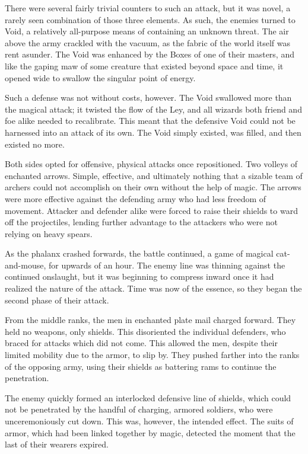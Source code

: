 There were several fairly trivial counters to such an attack, but it was novel, a rarely seen combination of those three elements. As such, the enemies turned to Void, a relatively all-purpose means of containing an unknown threat. The air above the army crackled with the vacuum, as the fabric of the world itself was rent asunder. The Void was enhanced by the Boxes of one of their masters, and like the gaping maw of some creature that existed beyond space and time, it opened wide to swallow the singular point of energy.

Such a defense was not without costs, however. The Void swallowed more than the magical attack; it twisted the flow of the Ley, and all wizards both friend and foe alike needed to recalibrate. This meant that the defensive Void could not be harnessed into an attack of its own. The Void simply existed, was filled, and then existed no more.

Both sides opted for offensive, physical attacks once repositioned. Two volleys of enchanted arrows. Simple, effective, and ultimately nothing that a sizable team of archers could not accomplish on their own without the help of magic. The arrows were more effective against the defending army who had less freedom of movement. Attacker and defender alike were forced to raise their shields to ward off the projectiles, lending further advantage to the attackers who were not relying on heavy spears.

As the phalanx crashed forwards, the battle continued, a game of magical cat-and-mouse, for upwards of an hour. The enemy line was thinning against the continued onslaught, but it was beginning to compress inward once it had realized the nature of the attack. Time was now of the essence, so they began the second phase of their attack.

From the middle ranks, the men in enchanted plate mail charged forward. They held no weapons, only shields. This disoriented the individual defenders, who braced for attacks which did not come. This allowed the men, despite their limited mobility due to the armor, to slip by. They pushed farther into the ranks of the opposing army, using their shields as battering rams to continue the penetration.

The enemy quickly formed an interlocked defensive line of shields, which could not be penetrated by the handful of charging, armored soldiers, who were unceremoniously cut down. This was, however, the intended effect. The suits of armor, which had been linked together by magic, detected the moment that the last of their wearers expired.

